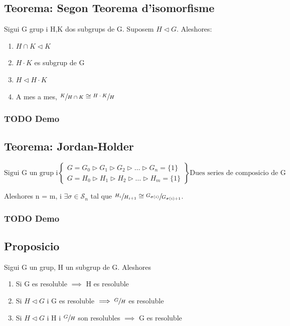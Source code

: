 \documentclass[11pt]{article}
\begin{document}
\subsection{Teorema: Segon Teorema d'isomorfisme}
\label{sec:org4bfa2cb}
Sigui G grup i H,K dos subgrups de G. Suposem \(H \vartriangleleft G\). Aleshores:
\begin{enumerate}
\item \(H \cap K \vartriangleleft K\)
\item \(H \cdot K\) es subgrup de G
\item \(H \vartriangleleft H \cdot K\)
\item A mes a mes, \(\sfrac{K}{H \cap K} \cong \sfrac{H \cdot K}{H}\)
\end{enumerate}

\subsubsection{{\bfseries\sffamily TODO} Demo}
\label{sec:org572810b}

\subsection{Teorema: Jordan-Holder}
\label{sec:org83d9524}
\begin{displaymath}
    \text{Sigui G un grup i}
               \left\{\begin{array}{ll}
G = G_0 \vartriangleright G_1 \vartriangleright G_2 \vartriangleright \ldots \vartriangleright G_n = \{1\} \\
G = H_0 \vartriangleright H_1 \vartriangleright H_2 \vartriangleright \ldots \vartriangleright H_m = \{1\}
                \end{array}
\right\rbrace
              \text{Dues series de composicio de G}
\end{displaymath}

Aleshores n = m, i \(\exists \sigma \in \mathcal{S}_n\) tal que \(\sfrac{H_i}{H_{i+1}} \cong \sfrac{G_{\sigma(i)}}{G_{\sigma(i)+1}}\).

\subsubsection{{\bfseries\sffamily TODO} Demo}
\label{sec:orgd799200}

\subsection{Proposicio}
\label{sec:org8edbe5d}
Sigui G un grup, H un subgrup de G. Aleshores
\begin{enumerate}
\item Si G es resoluble \(\implies\) H es resoluble
\item Si \(H \vartriangleleft G\) i G es resoluble \(\implies \sfrac{G}{H}\) es resoluble
\item Si \(H \vartriangleleft G\) i H i \(\sfrac{G}{H}\) son resolubles \(\implies\) G es resoluble
\end{enumerate}
\end{document}
